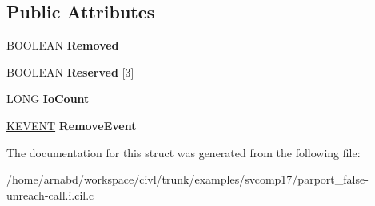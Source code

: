 \subsection*{Public Attributes}
\begin{DoxyCompactItemize}
\item 
\hypertarget{struct__IO__REMOVE__LOCK__COMMON__BLOCK_a0d1062524e667820c18b5343ede2a38a}{}B\+O\+O\+L\+E\+A\+N {\bfseries Removed}\label{struct__IO__REMOVE__LOCK__COMMON__BLOCK_a0d1062524e667820c18b5343ede2a38a}

\item 
\hypertarget{struct__IO__REMOVE__LOCK__COMMON__BLOCK_a6fec4aea0d50a6fe6bbda7c82f965234}{}B\+O\+O\+L\+E\+A\+N {\bfseries Reserved} \mbox{[}3\mbox{]}\label{struct__IO__REMOVE__LOCK__COMMON__BLOCK_a6fec4aea0d50a6fe6bbda7c82f965234}

\item 
\hypertarget{struct__IO__REMOVE__LOCK__COMMON__BLOCK_adc730677a3faad8f07f8f1638451a5cb}{}L\+O\+N\+G {\bfseries Io\+Count}\label{struct__IO__REMOVE__LOCK__COMMON__BLOCK_adc730677a3faad8f07f8f1638451a5cb}

\item 
\hypertarget{struct__IO__REMOVE__LOCK__COMMON__BLOCK_afac8a07c9df12e558a1b84b8be1326cb}{}\hyperlink{struct__KEVENT}{K\+E\+V\+E\+N\+T} {\bfseries Remove\+Event}\label{struct__IO__REMOVE__LOCK__COMMON__BLOCK_afac8a07c9df12e558a1b84b8be1326cb}

\end{DoxyCompactItemize}


The documentation for this struct was generated from the following file\+:\begin{DoxyCompactItemize}
\item 
/home/arnabd/workspace/civl/trunk/examples/svcomp17/parport\+\_\+false-\/unreach-\/call.\+i.\+cil.\+c\end{DoxyCompactItemize}
